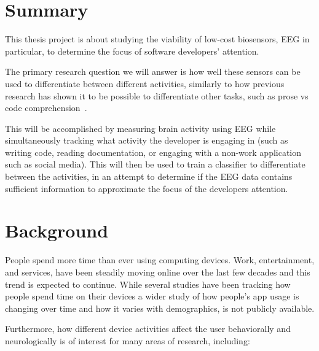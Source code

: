 \documentclass{IEEEtran}
\begin{document}
\begin{refsection}

\newcommand{\RQmain}{How well can data from low-cost EEG sensors be used to train a classifier separating software developers' device activities?}

\section{Summary}

This thesis project is about studying the viability of low-cost biosensors, EEG in particular, to determine the focus of software developers' attention. %

The primary research question we will answer is how well these sensors can be used to differentiate between different activities, similarly to how previous research has shown it to be possible to differentiate other tasks, such as prose vs code comprehension~\cite{fucci_replication_2019}.

This will be accomplished by measuring brain activity using EEG while simultaneously tracking what activity the developer is engaging in (such as writing code, reading documentation, or engaging with a non-work application such as social media). This will then be used to train a classifier to differentiate between the activities, in an attempt to determine if the EEG data contains sufficient information to approximate the focus of the developers attention.


\section{Background}

People spend more time than ever using computing devices. Work, entertainment, and services, have been steadily moving online over the last few decades and this trend is expected to continue.
While several studies have been tracking how people spend time on their devices a wider study of how people's app usage is changing over time and how it varies with demographics, is not publicly available.

Furthermore, how different device activities affect the user behaviorally and neurologically is of interest for many areas of research, including:


\end{refsection}
\end{document}
